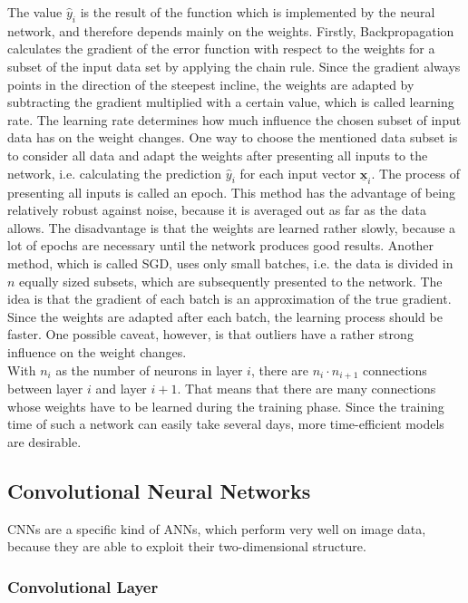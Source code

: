 \documentclass[11pt, a4paper]{article}
\newcommand\V[1]{\ensuremath{\underline{\mathbf{#1}}}}
\begin{document}
The value $\hat{y}_i$ is the result of the function which is implemented by the neural network, and therefore depends mainly on the weights. Firstly, Backpropagation calculates the gradient of the error function with respect to the weights for a subset of the input data set by applying the chain rule. Since the gradient always points in the direction of the steepest incline, the weights are adapted by subtracting the gradient multiplied with a certain value, which is called learning rate. The learning rate determines how much influence the chosen subset of input data has on the weight changes. One way to choose the mentioned data subset is to consider all data and adapt the weights after presenting all inputs to the network, i.e. calculating the prediction $\hat{y}_i$ for each input vector $\V{x}_i$. The process of presenting all inputs is called an epoch. This method has the advantage of being relatively robust against noise, because it is averaged out as far as the data allows. The disadvantage is that the weights are learned rather slowly, because a lot of epochs are necessary until the network produces good results. Another method, which is called \acf{SGD}, uses only small batches, i.e. the data is divided in $n$ equally sized subsets, which are subsequently presented to the network. The idea is that the gradient of each batch is an approximation of the true gradient. Since the weights are adapted after each batch, the learning process should be faster. One possible caveat, however, is that outliers have a rather strong influence on the weight changes.\\
With $n_i$ as the number of neurons in layer $i$, there are $n_i \cdot n_{i+1}$ connections between layer $i$ and layer $i+1$. That means that there are many connections whose weights have to be learned during the training phase. Since the training time of such a network can easily take several days, more time-efficient models are desirable.

\subsection{Convolutional Neural Networks}

\acfp{CNN} are a specific kind of \acp{ANN}, which perform very well on image data, because they are able to exploit their two-dimensional structure.

\subsubsection{Convolutional Layer}
\label{subsubsec:convolutionallayer}
\end{document}
